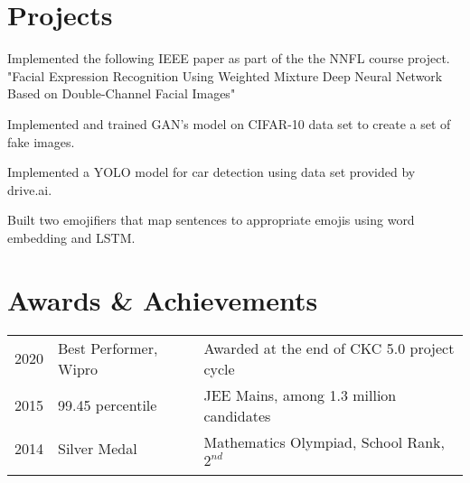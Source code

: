 \documentclass[]{plushcv}
\begin{document}
\begin{minipage}[t]{0.70\textwidth}
	\section{Projects}
	
	\begin{tightemize}
		\item Implemented the following IEEE paper as part of the the NNFL course project. "Facial Expression Recognition Using Weighted Mixture Deep Neural Network Based on Double-Channel Facial Images"
	\end{tightemize}
	\sectionsep
	
	\begin{tightemize}
		\item Implemented and trained GAN's model on CIFAR-10 data set to create a set of fake images.
	\end{tightemize}
	\sectionsep
	
	\begin{tightemize}
		\item Implemented a YOLO model for car detection using data set provided by drive.ai.
	\end{tightemize}
	\sectionsep
	
	\begin{tightemize}
		\item Built two emojifiers that map sentences to appropriate emojis using word embedding and LSTM.
	\end{tightemize}
	\sectionsep
	
	
	\section{Awards \& Achievements} 
	\begin{tabular}{rll}
		2020 & Best Performer, Wipro & Awarded at the end of CKC 5.0 project cycle \\
		2015 & 99.45 percentile      & JEE Mains, among 1.3 million candidates     \\
		2014 & Silver Medal          & Mathematics Olympiad, School Rank, $2^{nd}$ \\
		\\
	\end{tabular}
	\sectionsep
	
\end{minipage} 
\end{document}
